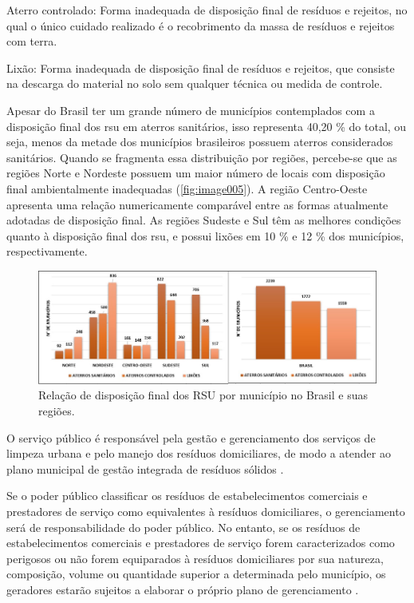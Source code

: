 	Aterro controlado: Forma inadequada de disposição final de resíduos e rejeitos, no qual o único cuidado realizado é o recobrimento da massa de resíduos e rejeitos com terra.

	Lixão: Forma inadequada de disposição final de resíduos e rejeitos, que consiste na descarga do material no solo sem qualquer técnica ou medida de controle.

	Apesar do Brasil ter um grande número de municípios contemplados com a disposição final dos \gls{rsu} em aterros sanitários, isso representa 40,20 \% do total, ou seja, menos da metade dos municípios brasileiros possuem aterros considerados sanitários. Quando se fragmenta essa distribuição por regiões, percebe-se que as regiões Norte e Nordeste possuem um maior número de locais com disposição final ambientalmente inadequadas (\autoref{fig:image005}). A região Centro-Oeste apresenta uma relação numericamente comparável entre as formas atualmente adotadas de disposição final. As regiões Sudeste e Sul têm as melhores condições quanto à disposição final dos \gls{rsu}, e possui lixões em 10 \% e 12 \% dos municípios, respectivamente.
	
\begin{figure}[h!]
	\centering
	\includegraphics[width=0.75\linewidth]{produtos/prodtres/image005}
	\caption{Relação de disposição final dos RSU por município no Brasil e suas regiões.}
	\label{fig:image005}
\end{figure}

	O serviço público é responsável pela gestão e gerenciamento dos serviços de limpeza urbana e pelo manejo dos resíduos domiciliares, de modo a atender ao plano municipal de gestão integrada de resíduos sólidos \cite{brasil:12305}.
	
	Se o poder público classificar os resíduos de estabelecimentos comerciais e prestadores de serviço como equivalentes à resíduos domiciliares, o gerenciamento será de responsabilidade do poder público. No entanto, se os resíduos de estabelecimentos comerciais e prestadores de serviço forem caracterizados como perigosos ou não forem equiparados à resíduos domiciliares por sua natureza, composição, volume ou quantidade superior a determinada pelo município, os geradores estarão sujeitos a elaborar o próprio plano de gerenciamento \cite{brasil:12305}.
	
